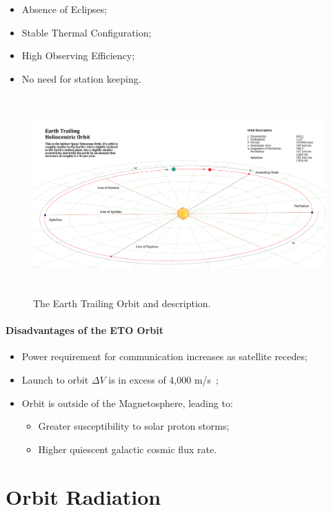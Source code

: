 \documentclass[11pt]{article}
\begin{document}
\begin{itemize}[noitemsep]
 \item Absence of Eclipses;
 \item Stable Thermal Configuration;
 \item High Observing Efficiency;
 \item No need for station keeping.
\end{itemize}

\begin{figure}[H]
    \centering
    \includegraphics[height=3.0in]{ETO_Diagram.png}
    \caption{The Earth Trailing Orbit and description.}
    \label{fig:ETO_Orbit}
\end{figure}
\paragraph{Disadvantages of the ETO Orbit}

\begin{itemize}[noitemsep]
 \item Power requirement for communication increases as satellite recedes;
  \item Launch to orbit $\Delta V$ is in excess of 4,000 m/s~\cite{joffre18};
 \item Orbit is outside of the Magnetosphere, leading to:
 \begin{itemize}[noitemsep]
            \setlength{\itemindent}{-.2in}
                 \item Greater susceptibility to solar proton storms;
                 \item Higher quiescent galactic cosmic flux rate.
            \end{itemize}       
\end{itemize}

\section{Orbit Radiation}
\end{document}
